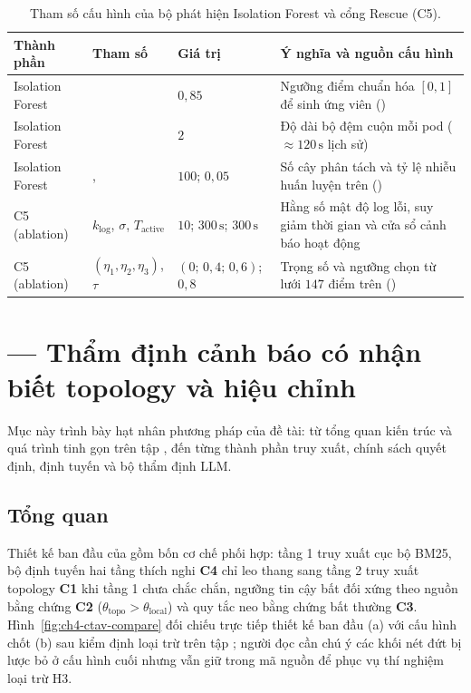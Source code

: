 \begin{table}[htbp]
  \centering
  \caption{Tham số cấu hình của bộ phát hiện Isolation Forest và cổng Rescue (C5).}
  \label{tab:ch4-detector-params}
  \footnotesize
  \begin{tabularx}{\linewidth}{@{}l l l Y@{}}
    \toprule
    \textbf{Thành phần} & \textbf{Tham số} & \textbf{Giá trị} & \textbf{Ý nghĩa và nguồn cấu hình} \\
    \midrule
    Isolation Forest &  & $0{,}85$ & Ngưỡng điểm chuẩn hóa $[0, 1]$ để sinh ứng viên () \\
    Isolation Forest &  & $2$ & Độ dài bộ đệm cuộn mỗi pod ($\approx 120\,\text{s}$ lịch sử) \\
    Isolation Forest & ,  & $100$;\; $0{,}05$ & Số cây phân tách và tỷ lệ nhiễu huấn luyện trên  () \\
    C5 (ablation) & $k_{\text{log}}$,\; $\sigma$,\; $T_{\text{active}}$ & $10$;\; $300\,\text{s}$;\; $300\,\text{s}$ & Hằng số mật độ log lỗi, suy giảm thời gian và cửa sổ cảnh báo hoạt động \\
    C5 (ablation) & $(\eta_1, \eta_2, \eta_3)$,\; $\tau$ & $(0;\, 0{,}4;\, 0{,}6)$;\; $0{,}8$ & Trọng số và ngưỡng chọn từ lưới $147$ điểm trên  () \\
    \bottomrule
  \end{tabularx}
\end{table}

\section{\CTAV{} — Thẩm định cảnh báo có nhận biết topology và hiệu chỉnh}
\label{sec:ch4-ctav}

Mục này trình bày hạt nhân phương pháp của đề tài: từ tổng quan kiến trúc \CTAV{} và quá trình tinh gọn trên tập , đến từng thành phần truy xuất, chính sách quyết định, định tuyến và bộ thẩm định LLM.

\subsection{Tổng quan \CTAV{}}
\label{sec:ch4-ctav-tong-quan}

Thiết kế ban đầu của \CTAV{} gồm bốn cơ chế phối hợp: tầng 1 truy xuất cục bộ BM25, bộ định tuyến hai tầng thích nghi \textbf{C4} chỉ leo thang sang tầng 2 truy xuất topology \textbf{C1} khi tầng 1 chưa chắc chắn, ngưỡng tin cậy bất đối xứng theo nguồn bằng chứng \textbf{C2} ($\theta_{\text{topo}} > \theta_{\text{local}}$) và quy tắc neo bằng chứng bất thường \textbf{C3}. Hình~\ref{fig:ch4-ctav-compare} đối chiếu trực tiếp thiết kế ban đầu (a) với cấu hình chốt (b) sau kiểm định loại trừ trên tập ; người đọc cần chú ý các khối nét đứt bị lược bỏ ở cấu hình cuối nhưng vẫn giữ trong mã nguồn để phục vụ thí nghiệm loại trừ H3.

